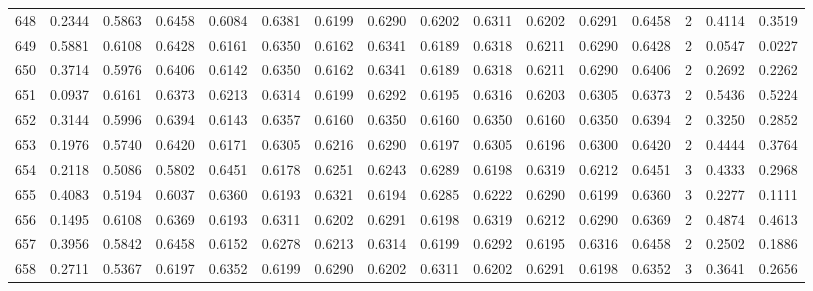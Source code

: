\begin{tabular}{lrrrrrrrrrrrrrrr}
648 &      0.2344 &  0.5863 &  0.6458 &  0.6084 &  0.6381 &  0.6199 &  0.6290 &  0.6202 &  0.6311 &  0.6202 &   0.6291 &     0.6458 &      2 &                    0.4114 &                     0.3519 \\
649 &      0.5881 &  0.6108 &  0.6428 &  0.6161 &  0.6350 &  0.6162 &  0.6341 &  0.6189 &  0.6318 &  0.6211 &   0.6290 &     0.6428 &      2 &                    0.0547 &                     0.0227 \\
650 &      0.3714 &  0.5976 &  0.6406 &  0.6142 &  0.6350 &  0.6162 &  0.6341 &  0.6189 &  0.6318 &  0.6211 &   0.6290 &     0.6406 &      2 &                    0.2692 &                     0.2262 \\
651 &      0.0937 &  0.6161 &  0.6373 &  0.6213 &  0.6314 &  0.6199 &  0.6292 &  0.6195 &  0.6316 &  0.6203 &   0.6305 &     0.6373 &      2 &                    0.5436 &                     0.5224 \\
652 &      0.3144 &  0.5996 &  0.6394 &  0.6143 &  0.6357 &  0.6160 &  0.6350 &  0.6160 &  0.6350 &  0.6160 &   0.6350 &     0.6394 &      2 &                    0.3250 &                     0.2852 \\
653 &      0.1976 &  0.5740 &  0.6420 &  0.6171 &  0.6305 &  0.6216 &  0.6290 &  0.6197 &  0.6305 &  0.6196 &   0.6300 &     0.6420 &      2 &                    0.4444 &                     0.3764 \\
654 &      0.2118 &  0.5086 &  0.5802 &  0.6451 &  0.6178 &  0.6251 &  0.6243 &  0.6289 &  0.6198 &  0.6319 &   0.6212 &     0.6451 &      3 &                    0.4333 &                     0.2968 \\
655 &      0.4083 &  0.5194 &  0.6037 &  0.6360 &  0.6193 &  0.6321 &  0.6194 &  0.6285 &  0.6222 &  0.6290 &   0.6199 &     0.6360 &      3 &                    0.2277 &                     0.1111 \\
656 &      0.1495 &  0.6108 &  0.6369 &  0.6193 &  0.6311 &  0.6202 &  0.6291 &  0.6198 &  0.6319 &  0.6212 &   0.6290 &     0.6369 &      2 &                    0.4874 &                     0.4613 \\
657 &      0.3956 &  0.5842 &  0.6458 &  0.6152 &  0.6278 &  0.6213 &  0.6314 &  0.6199 &  0.6292 &  0.6195 &   0.6316 &     0.6458 &      2 &                    0.2502 &                     0.1886 \\
658 &      0.2711 &  0.5367 &  0.6197 &  0.6352 &  0.6199 &  0.6290 &  0.6202 &  0.6311 &  0.6202 &  0.6291 &   0.6198 &     0.6352 &      3 &                    0.3641 &                     0.2656 \\

\end{tabular}

